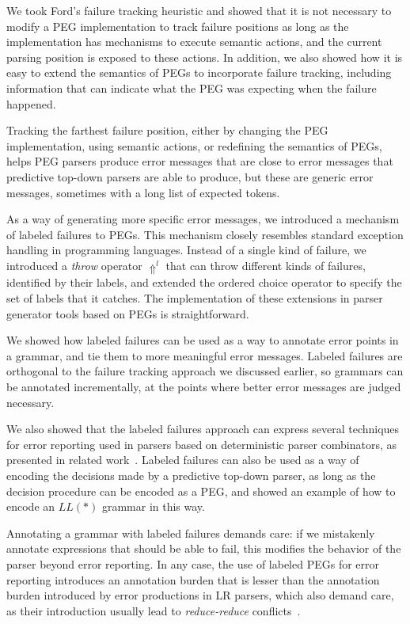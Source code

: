 \documentclass[3p,12pt,singlecolumn]{elsarticle}
\newcommand{\throw}{\Uparrow}
\begin{document}
We took Ford's failure tracking heuristic and showed that
it is not necessary to modify a PEG implementation to
track failure positions as long as the implementation
has mechanisms to execute semantic actions, and the
current parsing position is exposed to these actions.
In addition, we also showed how it is easy to extend
the semantics of PEGs to incorporate failure tracking,
including information that can indicate what the
PEG was expecting when the failure happened.

Tracking the farthest failure position, either by
changing the PEG implementation, using semantic actions,
or redefining the semantics of PEGs, helps PEG parsers
produce error messages that are close to error messages
that predictive top-down parsers are able to produce,
but these are generic error messages, sometimes with
a long list of expected tokens.

As a way of generating more specific error messages,
we introduced a mechanism of labeled failures to PEGs.
This mechanism closely resembles standard exception
handling in programming languages. Instead of a
single kind of failure, we introduced a \emph{throw} operator
$\throw^{l}$ that can throw different kinds of failures,
identified by their labels, and extended the ordered choice
operator to specify the set of labels that it catches.
The implementation of these extensions in parser generator
tools based on PEGs is straightforward.

We showed how labeled failures can be used as a way to
annotate error points in a grammar, and tie them to more
meaningful error messages. Labeled failures are orthogonal
to the failure tracking approach we discussed earlier, so
grammars can be annotated incrementally, at the points
where better error messages are judged necessary.

We also showed that the labeled failures approach can express
several techniques for error reporting used in parsers
based on deterministic parser combinators, as
presented in related
work~\cite{hutton1992hfp,rojemo1995epc,partridge1996fv,leijen2001parsec}.
Labeled failures can also be used as a way of encoding 
the decisions made by a predictive top-down parser, as long
as the decision procedure can be encoded as a PEG, and showed
an example of how to encode an $LL(*)$ grammar in this way.

Annotating a grammar with labeled failures demands care:
if we mistakenly annotate expressions that should be able to
fail, this modifies the behavior of the parser beyond error 
reporting. In any case, the use of labeled PEGs for error
reporting introduces an annotation burden that is
lesser than the annotation burden introduced by error
productions in LR parsers, which also demand care, as
their introduction usually lead to \textit{reduce-reduce}
conflicts~\cite{jeffery2003lre}.
\end{document}
